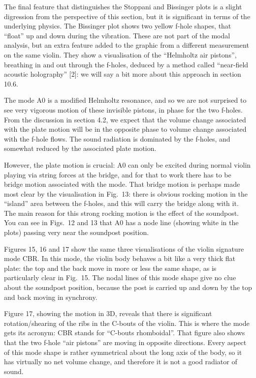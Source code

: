   The final feature that distinguishes the Stoppani and Bissinger plots is a 
  slight digression from the perspective of this section, but it is significant 
  in terms of the underlying physics. The Bissinger plot shows two yellow 
  f-hole shapes, that “float” up and down during the vibration. These are not 
  part of the modal analysis, but an extra feature added to the graphic from a 
  different measurement on the same violin. They show a visualisation of the 
  “Helmholtz air pistons”, breathing in and out through the f-holes, deduced by 
  a method called “near-field acoustic holography” [2]: we will say a bit more 
  about this approach in section 10.6. 

  The mode A0 is a modified Helmholtz resonance, and so we are not surprised to 
  see very vigorous motion of these invisible pistons, in phase for the two 
  f-holes. From the discussion in section 4.2, we expect that the volume change 
  associated with the plate motion will be in the opposite phase to volume 
  change associated with the f-hole flows. The sound radiation is dominated by 
  the f-holes, and somewhat reduced by the associated plate motion. 

  However, the plate motion is crucial: A0 can only be excited during normal 
  violin playing via string forces at the bridge, and for that to work there 
  has to be bridge motion associated with the mode. That bridge motion is 
  perhaps made most clear by the visualisation in Fig.\ 13: there is obvious 
  rocking motion in the “island” area between the f-holes, and this will carry 
  the bridge along with it. The main reason for this strong rocking motion is 
  the effect of the soundpost. You can see in Figs.\ 12 and 13 that A0 has a 
  node line (showing white in the plots) passing very near the soundpost 
  position. 

  Figures 15, 16 and 17 show the same three visualisations of the violin 
  signature mode CBR. In this mode, the violin body behaves a bit like a very 
  thick flat plate: the top and the back move in more or less the same shape, 
  as is particularly clear in Fig.\ 15. The nodal lines of this mode shape give 
  no clue about the soundpost position, because the post is carried up and down 
  by the top and back moving in synchrony. 

  Figure 17, showing the motion in 3D, reveals that there is significant 
  rotation/shearing of the ribs in the C-bouts of the violin. This is where the 
  mode gets its acronym: CBR stands for “C-bouts rhomboidal”. That figure also 
  shows that the two f-hole “air pistons” are moving in opposite directions. 
  Every aspect of this mode shape is rather symmetrical about the long axis of 
  the body, so it has virtually no net volume change, and therefore it is not a 
  good radiator of sound. 

